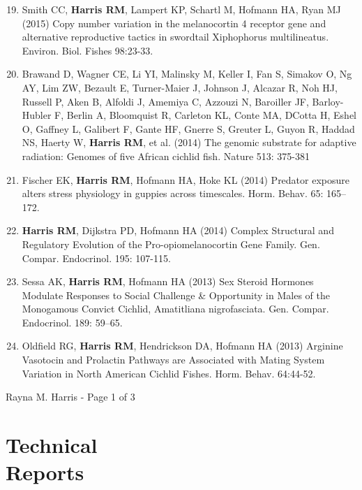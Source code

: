 \documentclass[margin,line]{resume}
\newenvironment{benumerate}[1]{
    \let\oldItem\item
    \def\item{\addtocounter{enumi}{-2}\oldItem}
    \begin{enumerate}
    \setcounter{enumi}{#1}
    \addtocounter{enumi}{1}
}{
    \end{enumerate}
}
\begin{document}
\begin{resume}
\begin{benumerate}{18}
\item Smith CC, {\bf Harris RM}, Lampert KP, Schartl M, Hofmann HA, Ryan MJ (2015) Copy number variation in the melanocortin 4 receptor gene and alternative reproductive tactics in swordtail Xiphophorus multilineatus. Environ. Biol. Fishes 98:23-33.

\item Brawand D, Wagner CE, Li YI, Malinsky M, Keller I, Fan S, Simakov O, Ng AY, Lim ZW, Bezault E, Turner-Maier J, Johnson J, Alcazar R, Noh HJ, Russell P, Aken B, Alfoldi J, Amemiya C, Azzouzi N, Baroiller JF, Barloy-Hubler F, Berlin A, Bloomquist R, Carleton KL, Conte MA, D\textsc{}Cotta H, Eshel O, Gaffney L, Galibert F, Gante HF, Gnerre S, Greuter L, Guyon R, Haddad NS, Haerty W, {\bf Harris RM}, et al. (2014) The genomic substrate for adaptive radiation: Genomes of five African cichlid fish. Nature 513: 375-381

\item Fischer EK, {\bf Harris RM}, Hofmann HA, Hoke KL (2014) Predator exposure alters stress physiology in guppies across timescales. Horm. Behav. 65: 165–172. 

\item {\bf Harris RM}, Dijkstra PD, Hofmann HA (2014) Complex Structural and Regulatory Evolution of the Pro-opiomelanocortin Gene Family. Gen. Compar. Endocrinol. 195: 107-115. 

\item Sessa AK, {\bf Harris RM}, Hofmann HA (2013) Sex Steroid Hormones Modulate Responses to Social Challenge \& Opportunity in Males of the Monogamous Convict Cichlid, Amatitliana nigrofasciata. Gen. Compar. Endocrinol. 189: 59–65. 

\item Oldfield RG, {\bf Harris RM}, Hendrickson DA, Hofmann HA (2013) Arginine Vasotocin and Prolactin Pathways are Associated with Mating System Variation in North American Cichlid Fishes. Horm. Behav. 64:44-52. 
\end{benumerate}

\vspace{1.0 cm}
{\centerline {Rayna M. Harris - Page 1 of 3}}
\newpage



\section{\mysidestyle Technical\\Reports}


\end{resume}
\end{document}
